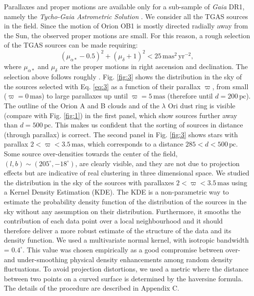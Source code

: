 \documentclass[twocolumn]{aa}
\begin{document}
Parallaxes and proper motions are available only for a sub-sample of \textit{Gaia} DR1, namely the \textit{Tycho-Gaia Astrometric Solution} \citep[TGAS][]{Michalik2015, Lindegren2016}. We consider all the TGAS sources in the field. 
Since the  motion of Orion OB1 is mostly directed radially away from the Sun, the observed proper motions are small. For this reason, a rough selection of the TGAS sources can be made requiring:
\begin{equation}\label{eq:3}
(\mu_{\alpha*} - 0.5)^2 + (\mu_{\delta}+1)^2 < 25  \,\mathrm{mas^2 \, yr^{-2}},
\end{equation}
where $\mu_{\alpha*}$ and $\mu_{\delta}$ are the proper motions in right ascension and declination. The selection above follows roughly \cite{deZeeuw1999}.
Fig. \ref{fig:3} shows the distribution  in the sky of the sources selected with Eq. \eqref{eq:3} as a function of their parallax $\varpi$, from small ($\varpi = 0 \, \mathrm{mas}$) to large parallaxes up until $\varpi = 5 \, \mathrm{mas}$ (therefore until $d = 200 \, \mathrm{pc}$).   
The outline of the Orion A and B clouds and of the $\lambda$ Ori dust ring is visible (compare with Fig. \ref{fig:1}) in the first panel, which show sources further away than $d = 500 \, \mathrm{pc}$.  This makes us confident that the sorting of sources in distance (through parallax) is correct.
The second panel in Fig. \ref{fig:3} shows stars with parallax $2 < \varpi < 3.5 \, \mathrm{mas}$, which corresponds to a distance $285 < d < 500 \, \mathrm{pc}$. 
Some source over-densities towards the center of the field, $(l, b) \sim (205^{\circ}, -18^{\circ})$, are clearly visible, and they are not due to projection effects but are indicative of real clustering in three dimensional space. 
We studied the  distribution in the sky of the sources with parallaxes $2 < \varpi < 3.5 \, \mathrm{mas}$ using a Kernel Density Estimation (KDE). The KDE is a non-parametric way to estimate the probability density function of the distribution of the sources in the sky without any assumption on their distribution. Furthermore, it smooths the contribution of each data point over a local neighbourhood and it should therefore deliver a more robust estimate of the structure of the data and its density function. We used a 
multivariate normal kernel, with isotropic  bandwidth =  $0.4^{\circ}$.  This value was chosen empirically as a good compromise between over- and under-smoothing physical density enhancements among random density fluctuations.
To avoid projection distortions, we used a metric where the distance between two points on a curved surface is determined by the haversine formula. The details of the procedure are described in Appendix C. 
\end{document}
